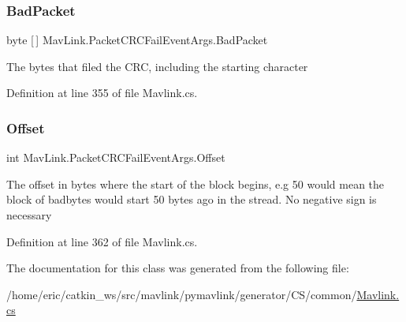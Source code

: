 \subsubsection{\texorpdfstring{BadPacket}{BadPacket}}
{\footnotesize\ttfamily byte \mbox{[}$\,$\mbox{]} Mav\+Link.\+Packet\+C\+R\+C\+Fail\+Event\+Args.\+Bad\+Packet}



The bytes that filed the C\+RC, including the starting character 



Definition at line 355 of file Mavlink.\+cs.

\mbox{\label{classMavLink_1_1PacketCRCFailEventArgs_a1313cf99a833ab9967fc1e6301f52eb0}} 
\subsubsection{\texorpdfstring{Offset}{Offset}}
{\footnotesize\ttfamily int Mav\+Link.\+Packet\+C\+R\+C\+Fail\+Event\+Args.\+Offset}



The offset in bytes where the start of the block begins, e.\+g 50 would mean the block of badbytes would start 50 bytes ago in the stread. No negative sign is necessary 



Definition at line 362 of file Mavlink.\+cs.



The documentation for this class was generated from the following file\+:\begin{DoxyCompactItemize}
\item 
/home/eric/catkin\+\_\+ws/src/mavlink/pymavlink/generator/\+C\+S/common/\mbox{\hyperlink{Mavlink_8cs}{Mavlink.\+cs}}\end{DoxyCompactItemize}

